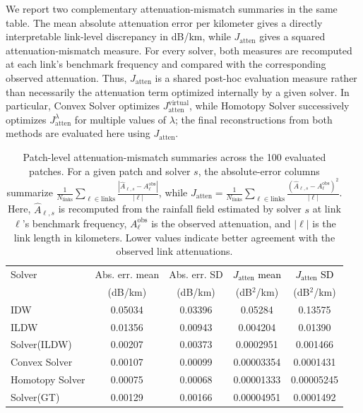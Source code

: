 \documentclass[11pt]{article}
\begin{document}
{\color{black}We report two complementary attenuation-mismatch summaries in the same table. The mean absolute attenuation error per kilometer gives a directly interpretable link-level discrepancy in dB/km, while $J_{\mathrm{atten}}$ gives a squared attenuation-mismatch measure. For every solver, both measures are recomputed at each link's benchmark frequency and compared with the corresponding observed attenuation. Thus, $J_{\mathrm{atten}}$ is a shared post-hoc evaluation measure rather than necessarily the attenuation term optimized internally by a given solver. In particular, Convex Solver optimizes $J_{\mathrm{atten}}^{\mathrm{virtual}}$, while Homotopy Solver successively optimizes $J_{\mathrm{atten}}^\lambda$ for multiple values of $\lambda$; the final reconstructions from both methods are evaluated here using $J_{\mathrm{atten}}$.}

\begin{table}[H]
  \centering
  \small
  \begin{tabular}{lcccc}
    \toprule
    Solver & Abs. err. mean & Abs. err. SD & \textcolor{black}{$J_{\mathrm{atten}}$ mean} & \textcolor{black}{$J_{\mathrm{atten}}$ SD} \\
    & (dB/km) & (dB/km) & (dB$^2$/km) & (dB$^2$/km) \\
    \midrule
    IDW & 0.05034 & 0.03396 & 0.05284 & 0.13575 \\
    ILDW & 0.01356 & 0.00943 & 0.004204 & 0.01390 \\
    Solver(ILDW) & 0.00207 & 0.00373 & 0.0002951 & 0.001466 \\
    Convex Solver & 0.00107 & 0.00099 & 0.00003354 & 0.0001431 \\
    Homotopy Solver & 0.00075 & 0.00068 & 0.00001333 & 0.00005245 \\
    Solver(GT) & 0.00129 & 0.00166 & 0.00004951 & 0.0001492 \\
    \bottomrule
  \end{tabular}
  \captionsetup{justification=raggedright,singlelinecheck=false}
  \caption{{\color{black}Patch-level attenuation-mismatch summaries across the 100 evaluated patches. For a given patch and solver $s$, the absolute-error columns summarize $\frac{1}{N_{\mathrm{links}}}\sum_{\ell \in \mathrm{links}} \frac{|\hat{A}_{\ell,s} - A_\ell^{\mathrm{obs}}|}{|\ell|}$, while $J_{\mathrm{atten}} = \frac{1}{N_{\mathrm{links}}}\sum_{\ell \in \mathrm{links}} \frac{\left(\hat{A}_{\ell,s} - A_\ell^{\mathrm{obs}}\right)^2}{|\ell|}$. Here, $\hat{A}_{\ell,s}$ is recomputed from the rainfall field estimated by solver $s$ at link $\ell$'s benchmark frequency, $A_\ell^{\mathrm{obs}}$ is the observed attenuation, and $|\ell|$ is the link length in kilometers. Lower values indicate better agreement with the observed link attenuations.}}
\end{table}
\end{document}
